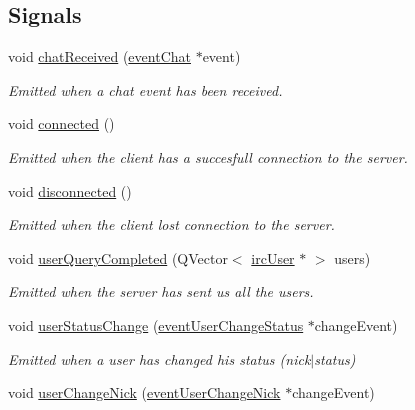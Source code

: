 \subsection*{Signals}
\begin{DoxyCompactItemize}
\item 
void \hyperlink{classclient_1_1cls_server_conn_ada02a27f01478db29d10bde4c51110b4}{chat\-Received} (\hyperlink{classshared_1_1events_1_1event_chat}{event\-Chat} $\ast$event)
\begin{DoxyCompactList}\small\item\em Emitted when a chat event has been received. \end{DoxyCompactList}\item 
void \hyperlink{classclient_1_1cls_server_conn_af4d99891fc606ce032facfd9e27692ca}{connected} ()
\begin{DoxyCompactList}\small\item\em Emitted when the client has a succesfull connection to the server. \end{DoxyCompactList}\item 
void \hyperlink{classclient_1_1cls_server_conn_ad5a08372105d83e34538e457374525f6}{disconnected} ()
\begin{DoxyCompactList}\small\item\em Emitted when the client lost connection to the server. \end{DoxyCompactList}\item 
void \hyperlink{classclient_1_1cls_server_conn_abad7931f40972d90b51e696b878b58c4}{user\-Query\-Completed} (Q\-Vector$<$ \hyperlink{classclient_1_1irc_user}{irc\-User} $\ast$ $>$ users)
\begin{DoxyCompactList}\small\item\em Emitted when the server has sent us all the users. \end{DoxyCompactList}\item 
void \hyperlink{classclient_1_1cls_server_conn_aa7679dfddcf23ffa4ce4febbc005995a}{user\-Status\-Change} (\hyperlink{classshared_1_1events_1_1event_user_change_status}{event\-User\-Change\-Status} $\ast$change\-Event)
\begin{DoxyCompactList}\small\item\em Emitted when a user has changed his status (nick$|$status) \end{DoxyCompactList}\item 
void \hyperlink{classclient_1_1cls_server_conn_af5b308ecbe7fda6ff5c7dd524e17817c}{user\-Change\-Nick} (\hyperlink{classshared_1_1events_1_1event_user_change_nick}{event\-User\-Change\-Nick} $\ast$change\-Event)

\end{DoxyCompactItemize}
